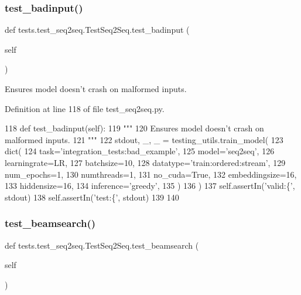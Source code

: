 \subsubsection{\texorpdfstring{test\+\_\+badinput()}{test\_badinput()}}
{\footnotesize\ttfamily def tests.\+test\+\_\+seq2seq.\+Test\+Seq2\+Seq.\+test\+\_\+badinput (\begin{DoxyParamCaption}\item[{}]{self }\end{DoxyParamCaption})}

\begin{DoxyVerb}Ensures model doesn't crash on malformed inputs.
\end{DoxyVerb}
 

Definition at line 118 of file test\+\_\+seq2seq.\+py.


\begin{DoxyCode}
118     \textcolor{keyword}{def }test\_badinput(self):
119         \textcolor{stringliteral}{"""}
120 \textcolor{stringliteral}{        Ensures model doesn't crash on malformed inputs.}
121 \textcolor{stringliteral}{        """}
122         stdout, \_, \_ = testing\_utils.train\_model(
123             dict(
124                 task=\textcolor{stringliteral}{'integration\_tests:bad\_example'},
125                 model=\textcolor{stringliteral}{'seq2seq'},
126                 learningrate=LR,
127                 batchsize=10,
128                 datatype=\textcolor{stringliteral}{'train:ordered:stream'},
129                 num\_epochs=1,
130                 numthreads=1,
131                 no\_cuda=\textcolor{keyword}{True},
132                 embeddingsize=16,
133                 hiddensize=16,
134                 inference=\textcolor{stringliteral}{'greedy'},
135             )
136         )
137         self.assertIn(\textcolor{stringliteral}{'valid:\{'}, stdout)
138         self.assertIn(\textcolor{stringliteral}{'test:\{'}, stdout)
139 
140 
\end{DoxyCode}
\mbox{\label{classtests_1_1test__seq2seq_1_1TestSeq2Seq_a78cb1bf4c31e8cd73d53e48797b9d7d9}} 
\subsubsection{\texorpdfstring{test\+\_\+beamsearch()}{test\_beamsearch()}}
{\footnotesize\ttfamily def tests.\+test\+\_\+seq2seq.\+Test\+Seq2\+Seq.\+test\+\_\+beamsearch (\begin{DoxyParamCaption}\item[{}]{self }\end{DoxyParamCaption})}

